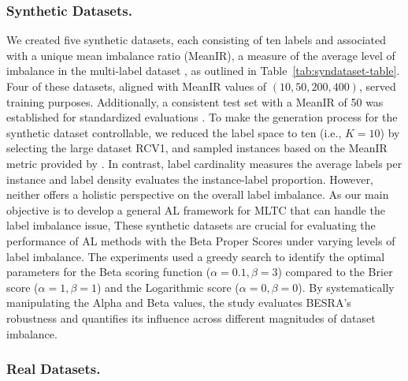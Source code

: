\documentclass[letterpaper]{article} %
\begin{document}
\subsubsection{Synthetic Datasets.}
We created five synthetic datasets, each consisting of ten labels and associated with a unique mean imbalance ratio (MeanIR), a measure of the average level of imbalance in the multi-label dataset \cite{CHARTE20153}, as outlined in Table~\ref{tab:syndataset-table}.
Four of these datasets, aligned with MeanIR values of $(10, 50, 200, 400)$, served training purposes. Additionally, a consistent test set with a MeanIR of 50 was established for standardized evaluations \cite{wang2023imbalanced}.
To make the generation process for the synthetic dataset controllable,
we reduced the label space to ten (i.e., $K=10$) by selecting the large dataset RCV1, and sampled instances based on the MeanIR metric provided by \citet{CHARTE20153}.
In contrast, label cardinality measures the average labels per instance and label density evaluates the instance-label proportion. However, neither offers a holistic perspective on the overall label imbalance.
As our main objective is to develop a general AL framework for MLTC that can handle the label imbalance issue,
These synthetic datasets are crucial for evaluating the performance of AL methods with the Beta Proper Scores under varying levels of label imbalance.
The experiments used a greedy search to identify the optimal parameters for the Beta scoring function ($\alpha = 0.1, \beta = 3$) compared to the Brier score ($\alpha = 1, \beta = 1$) and the Logarithmic score ($\alpha = 0, \beta = 0$).
By systematically manipulating the Alpha and Beta values, the study evaluates BESRA's robustness and quantifies its influence across different magnitudes of dataset imbalance.




\subsubsection{Real Datasets.}
\end{document}
